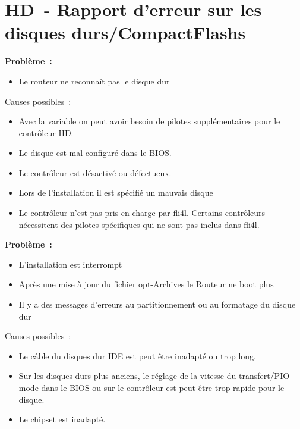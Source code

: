 
{
  \section{HD~- Rapport d'erreur sur les disques durs/CompactFlashs}
}
    \textbf{Problème~:}

    \begin{itemize}
    \item Le routeur ne reconnaît pas le disque dur
    \end{itemize}

    Causes possibles~:
    \begin{itemize}
    \item Avec la variable  on peut avoir
    besoin de pilotes supplémentaires pour le contrôleur HD. 
    \item Le disque est mal configuré dans le BIOS.
    \item Le contrôleur est désactivé ou défectueux.
    \item Lors de l'installation il est spécifié un mauvais disque
    \item Le contrôleur n'est pas pris en charge par fli4l. Certains contrôleurs
    nécessitent des pilotes spécifiques qui ne sont pas inclus dans fli4l.
    \end{itemize}

    \textbf{Problème~:}
    \begin{itemize}
    \item L'installation est interrompt
    \item Après une mise à jour du fichier opt-Archives le Routeur
      ne boot plus
    \item Il y a des messages d'erreurs au partitionnement ou au
      formatage du disque dur
    \end{itemize}

    Causes possibles~:
    \begin{itemize}
    \item Le câble du disques dur IDE est peut être inadapté ou trop long.
    \item Sur les disques durs plus anciens, le réglage de la vitesse du
    transfert/PIO-mode dans le BIOS ou sur le contrôleur est peut-être trop
    rapide pour le disque.
    \item Le chipset est inadapté.
    \end{itemize}

